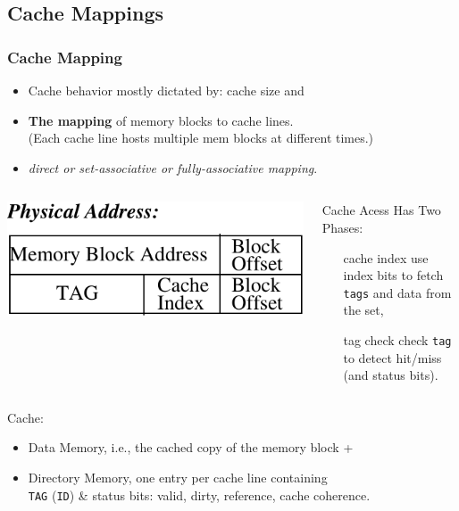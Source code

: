 \documentclass{beamer}
\renewcommand{\emph}[1]{\textcolor{structure}{#1}}
\newcommand{\emp}[1]{\textcolor{DikuRed}{ #1}}
\begin{document}
\subsection{Cache Mappings}

\begin{frame}[fragile,t]
\frametitle{Cache Mapping}
 
\begin{itemize}
    \item Cache behavior mostly dictated by: cache size and
    \item {\bf The mapping} of \emp{memory blocks} to \emph{cache lines}.\\
            (Each cache line hosts multiple mem blocks at different times.)
    \item {\em direct or set-associative or fully-associative mapping}.\smallskip
\end{itemize}
\begin{columns}
\includegraphics[width=25ex]{Figures/FigsMemH/CacheMapping}
\begin{scriptsize}
Cache Acess Has Two Phases:
\begin{itemize}
    \item[cache index] use index bits to fetch {\tt tags} and data from the set,
    \item[tag check] check {\tt tag} to detect hit/miss (and status bits).
\end{itemize} 
\end  {scriptsize}
\end{columns}

\bigskip
Cache:
\begin{itemize}
    \item \emph{Data Memory}, i.e., the cached copy of the memory block + 
    \item \emp{Directory Memory}, one entry per cache line containing\\ 
            {\tt TAG} ({\tt ID}) \& status bits: valid, dirty, reference, cache coherence.\\\smallskip
\end  {itemize}

\end{frame}
\end{document}
